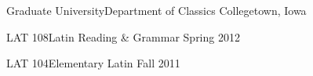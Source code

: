 

\headedsection %
{Graduate University\bull Department of Classics}
{Collegetown, Iowa} {

\headedsubsection %
{LAT 108\bull Latin Reading \& Grammar}
{Spring 2012}
{\vspace{-0.5\baselineskip}}

\headedsubsection %
{LAT 104\bull Elementary Latin}
{Fall 2011}
{\vspace{-0.5\baselineskip}}

}


\spacedhrule{0.5em}{-0.4em} %
